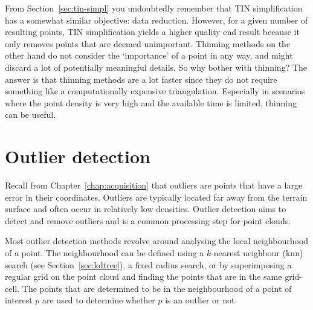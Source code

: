 From Section~\ref{sec:tin-simpl} you undoubtedly remember that TIN simplification has a somewhat similar objective: data reduction. 
However, for a given number of resulting points, TIN simplification yields a higher quality end result because it only removes points that are deemed unimportant.
Thinning methods on the other hand do not consider the `importance' of a point in any way, and might discard a lot of potentially meaningful details.
So why bother with thinning? The answer is that thinning methods are a lot faster since they do not require something like a computationally expensive triangulation.
Especially in scenarios where the point density is very high and the available time is limited, thinning can be useful.


%
\section{Outlier detection}%
\label{sec:outlier_detection}

Recall from Chapter~\ref{chap:acquisition} that outliers are points that have a large error in their coordinates.
Outliers are typically located far away from the terrain surface and often occur in relatively low densities.
Outlier detection aims to detect and remove outliers and is a common processing step for point clouds.

Most outlier detection methods revolve around analysing the local neighbourhood of a point.
The neighbourhood can be defined using a $k$-nearest neighbour (knn) search (see Section~\ref{sec:kdtree}), a fixed radius search, or by superimposing a regular grid on the point cloud and finding the points that are in the same grid-cell.
The points that are determined to be in the neighbourhood of a point of interest $p$ are used to determine whether $p$ is an outlier or not.

